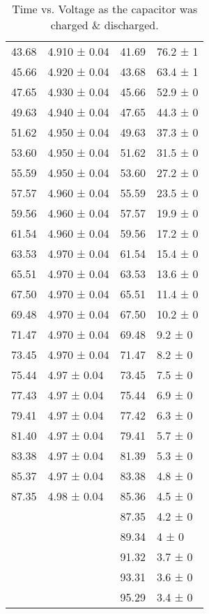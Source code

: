 \documentclass{report}
\begin{document}
\begin{table}[]
\begin{tabular}{@{}ll|ll@{}}
		43.68  & 4.910 ± 0.04 & 41.69        & 76.2 ± 1         \\
		45.66  & 4.920 ± 0.04 & 43.68        & 63.4 ± 1         \\
		47.65  & 4.930 ± 0.04 & 45.66        & 52.9 ± 0         \\
		49.63  & 4.940 ± 0.04 & 47.65        & 44.3 ± 0         \\
		51.62  & 4.950 ± 0.04 & 49.63        & 37.3 ± 0         \\
		53.60  & 4.950 ± 0.04 & 51.62        & 31.5 ± 0         \\
		55.59  & 4.950 ± 0.04 & 53.60        & 27.2 ± 0         \\
		57.57  & 4.960 ± 0.04 & 55.59        & 23.5 ± 0         \\
		59.56  & 4.960 ± 0.04 & 57.57        & 19.9 ± 0         \\
		61.54  & 4.960 ± 0.04 & 59.56        & 17.2 ± 0         \\
		63.53  & 4.970 ± 0.04 & 61.54        & 15.4 ± 0         \\
		65.51  & 4.970 ± 0.04 & 63.53        & 13.6 ± 0         \\
		67.50  & 4.970 ± 0.04 & 65.51        & 11.4 ± 0         \\
		69.48  & 4.970 ± 0.04 & 67.50        & 10.2 ± 0         \\
		71.47  & 4.970 ± 0.04 & 69.48        & 9.2 ± 0          \\
		73.45  & 4.970 ± 0.04 & 71.47        & 8.2 ± 0          \\
		75.44  & 4.97 ± 0.04  & 73.45        & 7.5 ± 0          \\
		77.43  & 4.97 ± 0.04  & 75.44        & 6.9 ± 0          \\
		79.41  & 4.97 ± 0.04  & 77.42        & 6.3 ± 0          \\
		81.40  & 4.97 ± 0.04  & 79.41        & 5.7 ± 0          \\
		83.38  & 4.97 ± 0.04  & 81.39        & 5.3 ± 0          \\
		85.37  & 4.97 ± 0.04  & 83.38        & 4.8 ± 0          \\
		87.35  & 4.98 ± 0.04  & 85.36        & 4.5 ± 0          \\
		&              & 87.35        & 4.2 ± 0          \\
		&              & 89.34        & 4 ± 0            \\
		&              & 91.32        & 3.7 ± 0          \\
		&              & 93.31        & 3.6 ± 0          \\
		&              & 95.29        & 3.4 ± 0          \\ \bottomrule
	\end{tabular}
	\caption{Time vs. Voltage as the capacitor was charged \& discharged.}
	\label{chdch}
\end{table}
\end{document}

